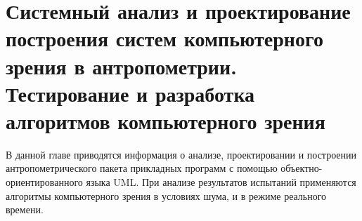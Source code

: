 

\chapter{Системный анализ и проектирование построения систем компьютерного зрения в антропометрии. Тестирование и разработка алгоритмов компьютерного зрения}
В данной главе приводятся информация о анализе, проектировании и построении антропометрического пакета прикладных программ с помощью  объектно-ориентированного языка UML. При анализе результатов испытаний применяются алгоритмы компьютерного зрения в условиях шума, и в режиме реального времени.





